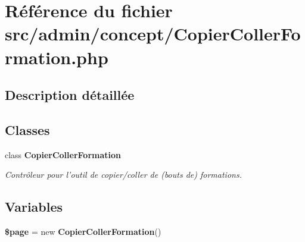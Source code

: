 \section{Référence du fichier src/admin/concept/CopierCollerFormation.php}
\label{_copier_coller_formation_8php}


\subsection{Description détaillée}


\subsection*{Classes}
\begin{CompactItemize}
\item 
class {\bf CopierCollerFormation}
\begin{CompactList}\small\item\em Contrôleur pour l'outil de copier/coller de (bouts de) formations. \item\end{CompactList}\end{CompactItemize}
\subsection*{Variables}
\begin{CompactItemize}
\item 
\textbf{\$page} = new {\bf CopierCollerFormation}()\label{_copier_coller_formation_8php_0a44e6760141442bb439b1ab1395d8ff}

\end{CompactItemize}
